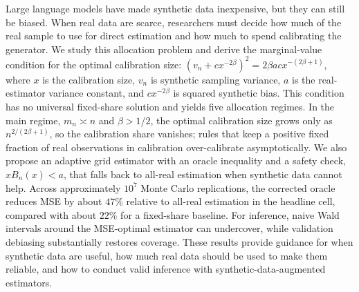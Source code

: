 Large language models have made synthetic data inexpensive, but they can still be biased. When real data are scarce, researchers must decide how much of the real sample to use for direct estimation and how much to spend calibrating the generator. We study this allocation problem and derive the marginal-value condition for the optimal calibration size: $(v_n + c x^{-2\beta})^2 = 2\beta a c x^{-(2\beta+1)}$, where $x$ is the calibration size, $v_n$ is synthetic sampling variance, $a$ is the real-estimator variance constant, and $c x^{-2\beta}$ is squared synthetic bias. This condition has no universal fixed-share solution and yields five allocation regimes. In the main regime, $m_n \asymp n$ and $\beta > 1/2$, the optimal calibration size grows only as $n^{2/(2\beta+1)}$, so the calibration share vanishes; rules that keep a positive fixed fraction of real observations in calibration over-calibrate asymptotically. We also propose an adaptive grid estimator with an oracle inequality and a safety check, $xB_n(x)<a$, that falls back to all-real estimation when synthetic data cannot help. Across approximately $10^7$ Monte Carlo replications, the corrected oracle reduces MSE by about $47\%$ relative to all-real estimation in the headline cell, compared with about $22\%$ for a fixed-share baseline. For inference, naive Wald intervals around the MSE-optimal estimator can undercover, while validation debiasing substantially restores coverage. These results provide guidance for when synthetic data are useful, how much real data should be used to make them reliable, and how to conduct valid inference with synthetic-data-augmented estimators.
